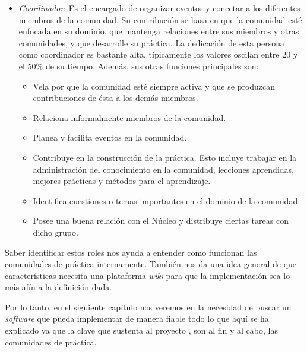 \begin{itemize}
\item \textit{Coordinador}: Es el encargado de organizar eventos y conectar a los diferentes miembros de la comunidad. Su contribución se basa en que la comunidad esté enfocada en su dominio, que mantenga relaciones entre sus miembros y otras comunidades, y que desarrolle su práctica. La dedicación de esta persona como coordinador es bastante alta, típicamente los valores oscilan entre 20 y el 50\% de su tiempo. Además, sus otras funciones principales son:
\begin{itemize}
\item Vela por que la comunidad esté siempre activa y que se produzcan contribuciones de ésta a los demás miembros.
\item Relaciona informalmente miembros de la comunidad.
\item Planea y facilita eventos en la comunidad.
\item Contribuye en la construcción de la práctica. Esto incluye trabajar en la administración del conocimiento en la comunidad, lecciones aprendidas, mejores prácticas y métodos para el aprendizaje.
\item Identifica cuestiones o temas importantes en el dominio de la comunidad.
\item Posee una buena relación con el Núcleo y distribuye ciertas tareas con dicho grupo.
\end{itemize}
\end{itemize}

Saber identificar estos roles nos ayuda a entender como funcionan las comunidades de práctica internamente. También nos da una idea general de que características necesita una plataforma \textit{wiki} para que la implementación sea lo más afín a la definición dada.

Por lo tanto, en el siguiente capítulo nos veremos en la necesidad de buscar un \textit{software} que pueda implementar de manera fiable todo lo que aquí se ha explicado ya que la clave que sustenta al proyecto \alma{}, son al fin y al cabo, las comunidades de práctica.